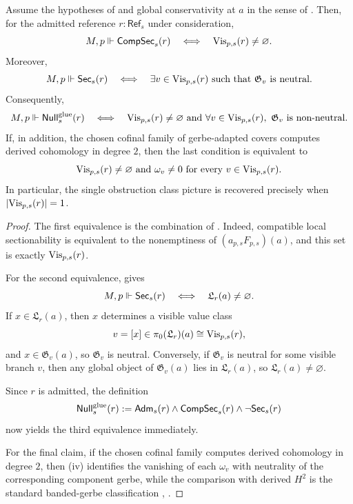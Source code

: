 \begin{theorem}\label{thm:gerbe-null-semantics}
Assume the hypotheses of  and global conservativity at $a$ in the sense of . Then, for the admitted reference $r:\mathsf{Ref}_s$ under consideration,
\[
M,p\Vdash \mathsf{CompSec}_s(r)
\quad\Longleftrightarrow\quad
\mathrm{Vis}_{p,s}(r)\neq\varnothing.
\]
Moreover,
\[
M,p\Vdash \mathsf{Sec}_s(r)
\quad\Longleftrightarrow\quad
\exists v\in \mathrm{Vis}_{p,s}(r)\ \text{such that}\ \mathfrak G_v\ \text{is neutral}.
\]
Consequently,
\[
M,p\Vdash \mathsf{Null}^{\mathrm{glue}}_s(r)
\quad\Longleftrightarrow\quad
\mathrm{Vis}_{p,s}(r)\neq\varnothing
\ \text{and}\
\forall v\in \mathrm{Vis}_{p,s}(r),\ \mathfrak G_v\ \text{is non-neutral}.
\]
If, in addition, the chosen cofinal family of gerbe-adapted covers computes derived cohomology in degree $2$, then the last condition is equivalent to
\[
\mathrm{Vis}_{p,s}(r)\neq\varnothing
\ \text{and}\
\omega_v\neq 0\ \text{for every}\ v\in \mathrm{Vis}_{p,s}(r).
\]
In particular, the single obstruction class picture is recovered precisely when $|\mathrm{Vis}_{p,s}(r)|=1$.
\end{theorem}

\begin{proof}
The first equivalence is the combination of . Indeed, compatible local sectionability is equivalent to the nonemptiness of $(a_{p,s}F_{p,s})(a)$, and this set is exactly $\mathrm{Vis}_{p,s}(r)$.

For the second equivalence, \Cref{prop:no-new-global-objects} gives
\[
M,p\Vdash \mathsf{Sec}_s(r)
\quad\Longleftrightarrow\quad
\mathfrak L_r(a)\neq\varnothing.
\]
If $x\in \mathfrak L_r(a)$, then $x$ determines a visible value class
\[
v=[x]\in \pi_0(\mathfrak L_r)(a)\cong \mathrm{Vis}_{p,s}(r),
\]
and $x\in \mathfrak G_v(a)$, so $\mathfrak G_v$ is neutral. Conversely, if $\mathfrak G_v$ is neutral for some visible branch $v$, then any global object of $\mathfrak G_v(a)$ lies in $\mathfrak L_r(a)$, so $\mathfrak L_r(a)\neq\varnothing$.

Since $r$ is admitted, the definition
\[
\mathsf{Null}^{\mathrm{glue}}_s(r):=\mathsf{Adm}_s(r)\land \mathsf{CompSec}_s(r)\land \neg\mathsf{Sec}_s(r)
\]
now yields the third equivalence immediately.

For the final claim, if the chosen cofinal family computes derived cohomology in degree $2$, then (iv) identifies the vanishing of each $\omega_v$ with neutrality of the corresponding component gerbe, while the comparison with derived $H^2$ is the standard banded-gerbe classification \cite[Chap.~IV]{Giraud1971}, \cite[Tag 06NY]{StacksProject}.
\end{proof}

